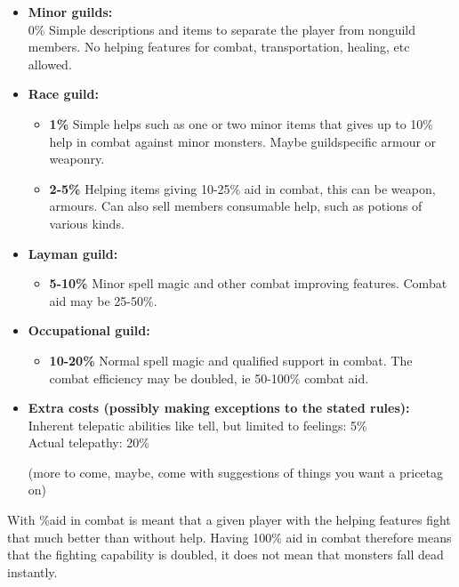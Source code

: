 \begin{itemize}
\item{\bf Minor guilds:} \\
    0\% Simple descriptions and items to separate the player
        from nonguild members. No helping features for combat,
        transportation, healing, etc allowed.

\item{\bf Race guild:}
    \begin{itemize}
    \item{\bf 1\%}  Simple helps such as one or two minor items that gives
        up to 10\% help in combat against minor monsters. Maybe 
        guildspecific armour or weaponry.
        
    \item{\bf 2-5\%} Helping items giving 10-25\% aid in combat, this can be
        weapon, armours. Can also sell members consumable help, 
        such as potions of various kinds.
    \end{itemize}

\item{\bf Layman guild:}
    \begin{itemize}
    \item{\bf 5-10\%} Minor spell magic and other combat improving features.
        Combat aid may be 25-50\%.
    \end{itemize}

\item{\bf Occupational guild:}
    \begin{itemize}
    \item{\bf 10-20\%} Normal spell magic and qualified support in combat. The
        combat efficiency may be doubled, ie 50-100\% combat aid.
    \end{itemize}

\item{\bf Extra costs (possibly making exceptions to the stated rules):} \\
    Inherent telepatic abilities
        like tell, but limited to feelings:  5\% \\
        Actual telepathy: 20\%

    (more to come, maybe, 
     come with suggestions of things you want a pricetag on)
\end{itemize}
        
With \%aid in combat is meant that a given player with the helping features
fight that much better than without help. Having 100\% aid in combat therefore
means that the fighting capability is doubled, it does not mean that monsters
fall dead instantly.

